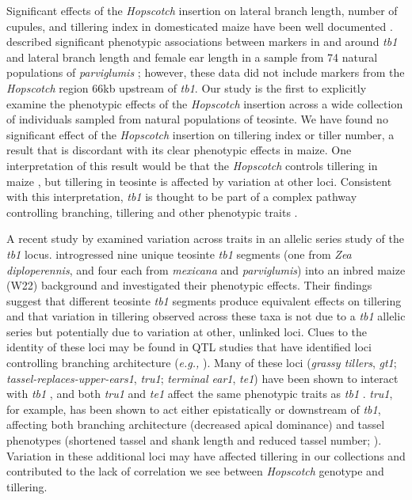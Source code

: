 \documentclass[11pt]{article} %
\begin{document}
\begin{linenumbers}
\begin{flushleft}
Significant effects of the \emph{Hopscotch} insertion on lateral branch length, number of cupules, and tillering index in domesticated maize have been well documented \citep{Studer2011}. \citet{Weber2007} described significant phenotypic associations between markers in and around \emph{tb1} and lateral branch length and female ear length in a sample from 74 natural populations of \emph{parviglumis} \citep{Weber2007}; however, these data did not include markers from the \emph{Hopscotch} region 66kb upstream of \emph{tb1}. Our study is the first to explicitly examine the phenotypic effects of the \emph{Hopscotch} insertion across a wide collection of individuals sampled from natural populations of teosinte. We have found no significant effect of the \emph{Hopscotch} insertion on tillering index or tiller number, a result that is discordant with its clear phenotypic effects in maize. One interpretation of this result would be that the \emph{Hopscotch} controls tillering in maize \citep{Studer2011}, but tillering in teosinte is affected by variation at other loci. Consistent with this interpretation, \emph{tb1} is thought to be part of a complex pathway controlling branching, tillering and other phenotypic traits \citep{KebromBrutnell2007, Clark2006}. 

A recent study by \citet{StuderDoebley2012} examined variation across traits in an allelic series study of the \emph{tb1} locus. \citet{StuderDoebley2012} introgressed nine unique teosinte \emph{tb1} segments (one from \emph{Zea diploperennis}, and four each from \emph{mexicana} and \emph{parviglumis}) into an inbred maize (W22) background and investigated their phenotypic effects. 
Their findings suggest that different teosinte \emph{tb1} segments produce equivalent effects on tillering and that variation in tillering observed across these taxa is not due to a \emph{tb1} allelic series but potentially due to variation at other, unlinked loci. Clues to the identity of these loci may be found in QTL studies that have identified loci controlling branching architecture (\emph{e.g.,} \citealt{DoebleyStec1991, DoebleyStec1993}). Many of these loci (\emph{grassy tillers}, \emph{gt1}; \emph{tassel-replaces-upper-ears1}, \emph{tru1}; \emph{terminal ear1}, \emph{te1}) have been shown to interact with \emph{tb1} \citep{Whipple2011, Li2012},  and both \emph{tru1} and \emph{te1} affect the same phenotypic traits as \emph{tb1} \citep{DoebleyStecGustus1995}. \emph{tru1}, for example, has been shown to act either epistatically or downstream of \emph{tb1}, affecting both branching architecture (decreased apical dominance) and tassel phenotypes (shortened tassel and shank length and reduced tassel number; \citealt{Li2012}). Variation in these additional loci may have affected tillering in our collections and contributed to the lack of correlation we see between \emph{Hopscotch} genotype and tillering. 


\end{flushleft}
\end{linenumbers}
\end{document}
